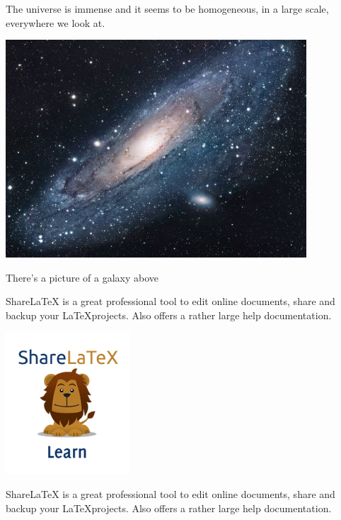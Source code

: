 \documentclass{article}
\begin{document}
The universe is immense and it seems to be homogeneous, in a large scale, everywhere we look at.

\includegraphics{universe}

There's a picture of a galaxy above

\vspace{1.5cm}

ShareLaTeX is a great professional tool to edit online documents, 
share and backup your \LaTeX projects. Also offers a 
rather large help documentation.

\includegraphics[scale=1.5]{lion-logo.png}

\newpage

ShareLaTeX is a great professional tool to edit online documents, 
share and backup your \LaTeX projects. Also offers a 
rather large help documentation.
\end{document}
